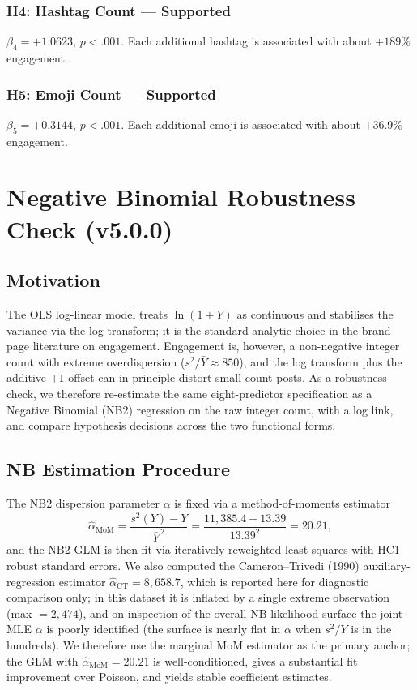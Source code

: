 \documentclass[12pt,a4paper]{article}
\begin{document}
\subsubsection*{H4: Hashtag Count --- Supported}
$\beta_4 = +1.0623$, $p<.001$. Each additional hashtag is associated with about $+189\%$ engagement.

\subsubsection*{H5: Emoji Count --- Supported}
$\beta_5 = +0.3144$, $p<.001$. Each additional emoji is associated with about $+36.9\%$ engagement.

\newpage

\section{Negative Binomial Robustness Check (v5.0.0)}
\label{sec:nb}

\subsection{Motivation}

The OLS log-linear model treats $\ln(1+Y)$ as continuous and stabilises the variance via the log transform; it is the standard analytic choice in the brand-page literature on engagement. Engagement is, however, a non-negative integer count with extreme overdispersion ($s^2/\bar Y\approx 850$), and the log transform plus the additive $+1$ offset can in principle distort small-count posts. As a robustness check, we therefore re-estimate the same eight-predictor specification as a Negative Binomial (NB2) regression on the raw integer count, with a log link, and compare hypothesis decisions across the two functional forms.

\subsection{NB Estimation Procedure}

The NB2 dispersion parameter $\alpha$ is fixed via a method-of-moments estimator
\begin{equation}
\hat\alpha_{\text{MoM}} = \frac{s^2(Y)-\bar Y}{\bar Y^{\,2}} = \frac{11{,}385.4-13.39}{13.39^{2}} = 20.21,
\end{equation}
and the NB2 GLM is then fit via iteratively reweighted least squares with HC1 robust standard errors. We also computed the Cameron--Trivedi (1990) auxiliary-regression estimator $\hat\alpha_{\text{CT}}=8{,}658.7$, which is reported here for diagnostic comparison only; in this dataset it is inflated by a single extreme observation (max $=2{,}474$), and on inspection of the overall NB likelihood surface the joint-MLE $\alpha$ is poorly identified (the surface is nearly flat in $\alpha$ when $s^2/\bar Y$ is in the hundreds). We therefore use the marginal MoM estimator as the primary anchor; the GLM with $\hat\alpha_{\text{MoM}}=20.21$ is well-conditioned, gives a substantial fit improvement over Poisson, and yields stable coefficient estimates.
\end{document}

